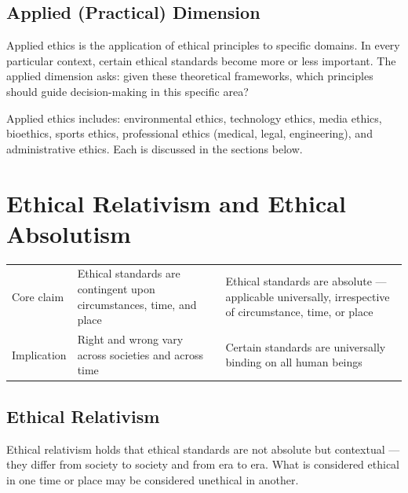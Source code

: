 \subsection{Applied (Practical) Dimension}

Applied ethics is the application of ethical principles to specific domains. In every particular context, certain ethical standards become more or less important. The applied dimension asks: given these theoretical frameworks, which principles should guide decision-making in this specific area?

Applied ethics includes: environmental ethics, technology ethics, media ethics, bioethics, sports ethics, professional ethics (medical, legal, engineering), and administrative ethics. Each is discussed in the sections below.

\section{Ethical Relativism and Ethical Absolutism}

\begin{center}
\begin{tabularx}{\textwidth}{>{\raggedright\arraybackslash}p{2.6cm} Y Y}
 &  &  \\
\toprule
Core claim & Ethical standards are contingent upon circumstances, time, and place & Ethical standards are absolute --- applicable universally, irrespective of circumstance, time, or place \\
Implication & Right and wrong vary across societies and across time & Certain standards are universally binding on all human beings \\
\bottomrule
\end{tabularx}
\end{center}

\subsection{Ethical Relativism}

Ethical relativism holds that ethical standards are not absolute but contextual --- they differ from society to society and from era to era. What is considered ethical in one time or place may be considered unethical in another.

